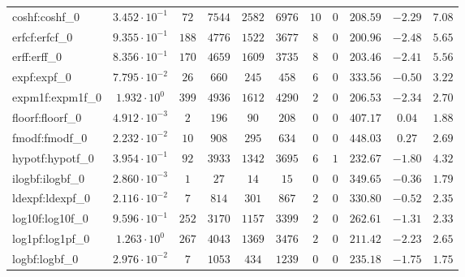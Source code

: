 \begin{tabular}{|l|c|c|c|c|c|c|c|c|c|c|}
coshf:coshf\_0               & $ 3.452 \cdot 10^{-1} $ & $ 72     $ & $ 7544   $ & $ 2582  $ & $ 6976   $ & $ 10  $ & $ 0 $ & $ 208.59      $ & $ -2.29   $ & $ 7.08    $ \\
erfcf:erfcf\_0               & $ 9.355 \cdot 10^{-1} $ & $ 188    $ & $ 4776   $ & $ 1522  $ & $ 3677   $ & $ 8   $ & $ 0 $ & $ 200.96      $ & $ -2.48   $ & $ 5.65    $ \\
erff:erff\_0                 & $ 8.356 \cdot 10^{-1} $ & $ 170    $ & $ 4659   $ & $ 1609  $ & $ 3735   $ & $ 8   $ & $ 0 $ & $ 203.46      $ & $ -2.41   $ & $ 5.56    $ \\
expf:expf\_0                 & $ 7.795 \cdot 10^{-2} $ & $ 26     $ & $ 660    $ & $ 245   $ & $ 458    $ & $ 6   $ & $ 0 $ & $ 333.56      $ & $ -0.50   $ & $ 3.22    $ \\
expm1f:expm1f\_0             & $ 1.932 \cdot 10^{0}  $ & $ 399    $ & $ 4936   $ & $ 1612  $ & $ 4290   $ & $ 2   $ & $ 0 $ & $ 206.53      $ & $ -2.34   $ & $ 2.70    $ \\
floorf:floorf\_0             & $ 4.912 \cdot 10^{-3} $ & $ 2      $ & $ 196    $ & $ 90    $ & $ 208    $ & $ 0   $ & $ 0 $ & $ 407.17      $ & $ 0.04    $ & $ 1.88    $ \\
fmodf:fmodf\_0               & $ 2.232 \cdot 10^{-2} $ & $ 10     $ & $ 908    $ & $ 295   $ & $ 634    $ & $ 0   $ & $ 0 $ & $ 448.03      $ & $ 0.27    $ & $ 2.69    $ \\
hypotf:hypotf\_0             & $ 3.954 \cdot 10^{-1} $ & $ 92     $ & $ 3933   $ & $ 1342  $ & $ 3695   $ & $ 6   $ & $ 1 $ & $ 232.67      $ & $ -1.80   $ & $ 4.32    $ \\
ilogbf:ilogbf\_0             & $ 2.860 \cdot 10^{-3} $ & $ 1      $ & $ 27     $ & $ 14    $ & $ 15     $ & $ 0   $ & $ 0 $ & $ 349.65      $ & $ -0.36   $ & $ 1.79    $ \\
ldexpf:ldexpf\_0             & $ 2.116 \cdot 10^{-2} $ & $ 7      $ & $ 814    $ & $ 301   $ & $ 867    $ & $ 2   $ & $ 0 $ & $ 330.80      $ & $ -0.52   $ & $ 2.35    $ \\
log10f:log10f\_0             & $ 9.596 \cdot 10^{-1} $ & $ 252    $ & $ 3170   $ & $ 1157  $ & $ 3399   $ & $ 2   $ & $ 0 $ & $ 262.61      $ & $ -1.31   $ & $ 2.33    $ \\
log1pf:log1pf\_0             & $ 1.263 \cdot 10^{0}  $ & $ 267    $ & $ 4043   $ & $ 1369  $ & $ 3476   $ & $ 2   $ & $ 0 $ & $ 211.42      $ & $ -2.23   $ & $ 2.65    $ \\
logbf:logbf\_0               & $ 2.976 \cdot 10^{-2} $ & $ 7      $ & $ 1053   $ & $ 434   $ & $ 1239   $ & $ 0   $ & $ 0 $ & $ 235.18      $ & $ -1.75   $ & $ 1.75    $ \\

\end{tabular}
